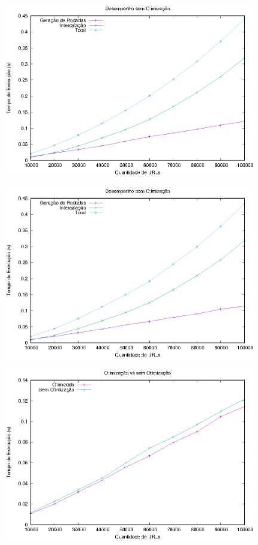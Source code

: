\documentclass{article}
\begin{document}
\begin{figure}[H]
	\includegraphics[width=11cm]{not-opt.eps}
	\centering
\end{figure}

\begin{figure}[H]
	\includegraphics[width=11cm]{opt.eps}
	\centering
\end{figure}

\begin{figure}[H]
	\includegraphics[width=11cm]{qs.eps}
	\centering
\end{figure}
\end{document}
